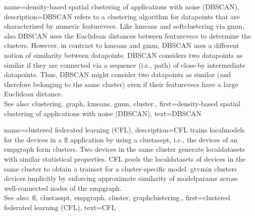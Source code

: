 {name={density-based spatial clustering of applications with noise (DBSCAN)}, 
	description={DBSCAN refers to a \gls{clustering} \gls{algorithm} for \glspl{datapoint} 
			that are characterized by numeric \glspl{featurevec}. 
		Like \gls{kmeans} and \gls{softclustering} via \gls{gmm}, also DBSCAN uses the Euclidean 
		distances between \glspl{featurevec} to determine the \glspl{cluster}. However, in contrast to \gls{kmeans} 
		and \gls{gmm}, DBSCAN uses a different notion of similarity between \glspl{datapoint}. 
		DBSCAN considers two \glspl{datapoint} as similar if they are connected 
		via a sequence (i.e., path) of close-by intermediate \glspl{datapoint}. 
		Thus, DBSCAN might consider two \glspl{datapoint} as similar (and therefore belonging 
		to the same \gls{cluster}) even if their \glspl{featurevec} have a large Euclidean distance.
				\\
		See also: \gls{clustering}, \gls{graph}, \gls{kmeans}, \gls{gmm}, \gls{cluster}.},
	first={density-based spatial clustering of applications with noise (DBSCAN)},
	text={DBSCAN} 
}

	
{name={clustered federated learning (CFL)}, 
description={CFL trains \glspl{localmodel} for the 
 	\glspl{device} in a \gls{fl} application by using a \gls{clustasspt}, i.e., the \glspl{device} 
 	of an \gls{empgraph} form \glspl{cluster}. Two \glspl{device} in the same \gls{cluster} generate 
 	\glspl{localdataset} with similar statistical properties. CFL pools the \glspl{localdataset} of \glspl{device} 
 	in the same \gls{cluster} to obtain a \gls{trainset} for a \gls{cluster}-specific \gls{model}. 
 	\Gls{gtvmin} clusters \glspl{device} implicitly by enforcing approximate similarity of \gls{modelparams} 
 	across well-connected nodes of the \gls{empgraph}.\\ 
 	See also: \gls{fl}, \gls{clustasspt}, \gls{empgraph}, \gls{cluster}, \gls{graphclustering}.},
	first={clustered federated learning (CFL)},
	text={CFL} }

